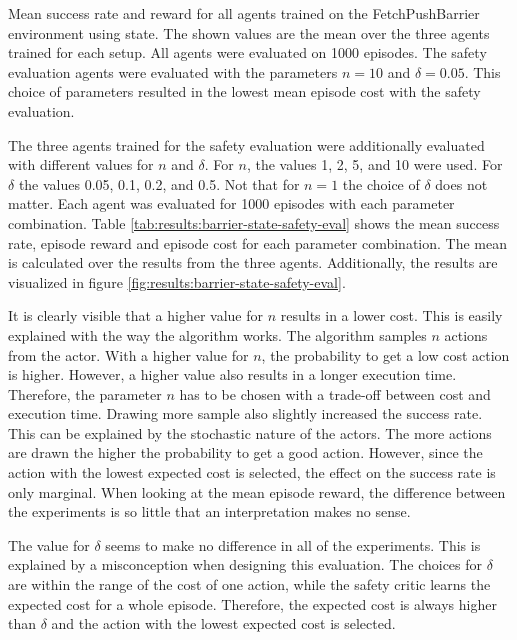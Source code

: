 \begin{table}[btp]
    \centering
    
    \caption[Mean success rate, reward and cost for all agents trained on the FetchPushBarrier environment using state.]{Mean success rate and reward for all agents trained on the FetchPushBarrier environment using state. The shown values are the mean over the three agents trained for each setup. All agents were evaluated on 1000 episodes. The safety evaluation agents were evaluated with the parameters $n=10$ and $\delta=0.05$. This choice of parameters resulted in the lowest mean episode cost with the safety evaluation.}
    \label{tab:results:barrier-state}
\end{table}

The three agents trained for the safety evaluation were additionally evaluated with different values for $n$ and $\delta$. For $n$, the values 1, 2, 5, and 10 were used. For $\delta$ the values 0.05, 0.1, 0.2, and 0.5. Not that for $n=1$ the choice of $\delta$ does not matter. Each agent was evaluated for 1000 episodes with each parameter combination. Table \ref{tab:results:barrier-state-safety-eval} shows the mean success rate, episode reward and episode cost for each parameter combination. The mean is calculated over the results from the three agents. Additionally, the results are visualized in figure \ref{fig:results:barrier-state-safety-eval}.

It is clearly visible that a higher value for $n$ results in a lower cost. This is easily explained with the way the algorithm works. The algorithm samples $n$ actions from the actor. With a higher value for $n$, the probability to get a low cost action is higher. However, a higher value also results in a longer execution time. Therefore, the parameter $n$ has to be chosen with a trade-off between cost and execution time. Drawing more sample also slightly increased the success rate. This can be explained by the stochastic nature of the actors. The more actions are drawn the higher the probability to get a good action. However, since the action with the lowest expected cost is selected, the effect on the success rate is only marginal. When looking at the mean episode reward, the difference between the experiments is so little that an interpretation makes no sense.

The value for $\delta$ seems to make no difference in all of the experiments. This is explained by a misconception when designing this evaluation. The choices for $\delta$ are within the range of the cost of one action, while the safety critic learns the expected cost for a whole episode. Therefore, the expected cost is always higher than $\delta$ and the action with the lowest expected cost is selected.

